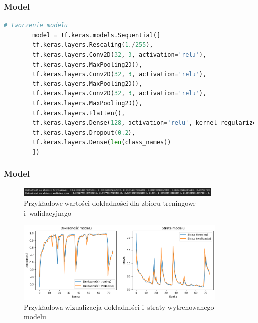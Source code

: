 \begin{frame}[fragile]
    \frametitle{Model}

    \begin{lstlisting}[language=Python,caption=Listing skryptu tworzącego model z~walidacją krzyżową
        oraz uczonym na~wszystkich wariantach liczby wierzchołków grafów,basicstyle=\ttfamily\small]
        # Tworzenie modelu
        model = tf.keras.models.Sequential([
        tf.keras.layers.Rescaling(1./255),
        tf.keras.layers.Conv2D(32, 3, activation='relu'),
        tf.keras.layers.MaxPooling2D(),
        tf.keras.layers.Conv2D(32, 3, activation='relu'),
        tf.keras.layers.MaxPooling2D(),
        tf.keras.layers.Conv2D(32, 3, activation='relu'),
        tf.keras.layers.MaxPooling2D(),
        tf.keras.layers.Flatten(),
        tf.keras.layers.Dense(128, activation='relu', kernel_regularizer=tf.keras.regularizers.l2(0.01)),
        tf.keras.layers.Dropout(0.2),
        tf.keras.layers.Dense(len(class_names))
        ])
    \end{lstlisting}

\end{frame}

\begin{frame}
    \frametitle{Model}

    \begin{figure}[ht]
        \centering
        \includegraphics[width=10cm]{../thesis/resources/model/images/scr-standard-result.png}
        \caption{Przykładowe wartości dokładności dla zbioru treningowe i~walidacyjnego}
    \end{figure}
    
    \begin{figure}[ht]
        \centering
        \includegraphics[height=4cm]{../thesis/resources/model/images/v2_epoch75.png}
        \caption{Przykładowa wizualizacja dokładności i~straty wytrenowanego modelu}
    \end{figure}

\end{frame}